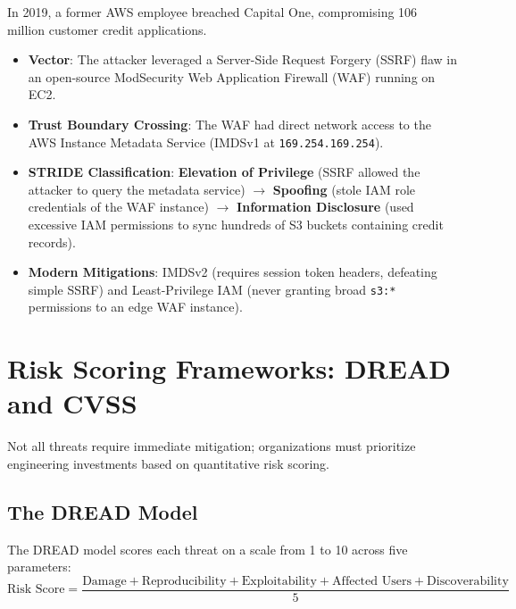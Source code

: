 \begin{realworldbox}
In 2019, a former AWS employee breached Capital One, compromising 106 million customer credit applications. 
\begin{itemize}
  \item \textbf{Vector}: The attacker leveraged a Server-Side Request Forgery (SSRF) flaw in an open-source ModSecurity Web Application Firewall (WAF) running on EC2.
  \item \textbf{Trust Boundary Crossing}: The WAF had direct network access to the AWS Instance Metadata Service (IMDSv1 at \texttt{169.254.169.254}).
  \item \textbf{STRIDE Classification}: \textbf{Elevation of Privilege} (SSRF allowed the attacker to query the metadata service) $\rightarrow$ \textbf{Spoofing} (stole IAM role credentials of the WAF instance) $\rightarrow$ \textbf{Information Disclosure} (used excessive IAM permissions to sync hundreds of S3 buckets containing credit records).
  \item \textbf{Modern Mitigations}: IMDSv2 (requires session token headers, defeating simple SSRF) and Least-Privilege IAM (never granting broad \texttt{s3:*} permissions to an edge WAF instance).
\end{itemize}
\end{realworldbox}

\section{Risk Scoring Frameworks: DREAD and CVSS}

Not all threats require immediate mitigation; organizations must prioritize engineering investments based on quantitative risk scoring.

\subsection{The DREAD Model}

The DREAD model scores each threat on a scale from 1 to 10 across five parameters:
\begin{equation}
\text{Risk Score} = \frac{\text{Damage} + \text{Reproducibility} + \text{Exploitability} + \text{Affected Users} + \text{Discoverability}}{5}
\end{equation}

